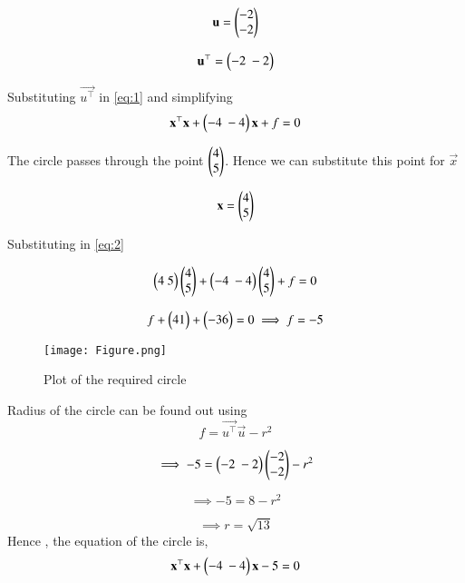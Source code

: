 \documentclass[journal,12pt,twocolumn]{IEEEtran}
\begin{document}
\begin{equation}
    \mathbf u=\begin{pmatrix}-2\\-2 \end{pmatrix}
\end{equation}

\begin{equation}
    \Vec{u^\top}=\myvec{-2  \ -2}
\end{equation}

Substituting $\vec{u^\top}$ in \ref{eq:1} and simplifying
\begin{equation}
\mathbf{x^\top}\mathbf{x}+\begin{pmatrix}-4 \ -4 \end{pmatrix}\mathbf{x}+f=0 \label{eq:2}
\end{equation}

The circle passes through the point $\begin{pmatrix}4\\5\end{pmatrix}$. Hence we can substitute this point for $\vec{x}$

\begin{equation}
    \mathbf{x}=\begin{pmatrix}4\\5\end{pmatrix} 
\end{equation}

Substituting in \ref{eq:2}

\begin{equation}
    \myvec{4 \ 5}\myvec{4\\5}+\myvec{-4 \ -4}\myvec{4\\5}+f=0
\end{equation}

\begin{equation}
f+\begin{pmatrix}41\end{pmatrix}+\begin{pmatrix}-36\end{pmatrix} = 0 \implies  f = -5
\end{equation}

\begin{figure}[!h]
         \centering
         \texttt{[image: Figure.png]}
         \caption{Plot of the required circle}
         \label{Figure}
\end{figure}

Radius of the circle can be found out using
\begin{equation}
f=\vec{u^\top}\vec{u}-r^2
\end{equation}

\begin{equation}
\implies -5 = \myvec{-2 \ -2}\myvec{-2\\-2}-r^2
\end{equation}

\begin{equation}
   \implies -5=8-r^2 
\end{equation}

\begin{equation}
    \implies r=\sqrt{13}
\end{equation}
Hence , the equation of the circle is,
\begin{equation}
    \mathbf{x^\top}\mathbf{x}+\begin{pmatrix}-4 \ -4 \end{pmatrix}\mathbf{x}-5=0
\end{equation}
\end{document}
